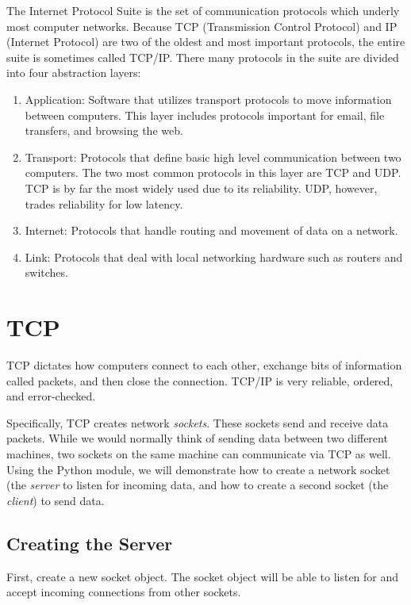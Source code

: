 
The Internet Protocol Suite is the set of communication protocols which underly most computer networks.
Because TCP (Transmission Control Protocol) and IP (Internet Protocol) are two of the oldest and most important protocols, the entire suite is sometimes called TCP/IP.
There many protocols in the suite are divided into four abstraction layers:
\begin{enumerate}
\item Application: Software that utilizes transport protocols to move information between computers.
This layer includes protocols important for email, file transfers, and browsing the web.
\item Transport: Protocols that define basic high level communication between two computers.
The two most common protocols in this layer are TCP and UDP. 
TCP is by far the most widely used due to its reliability.
UDP, however, trades reliability for low latency.
\item Internet: Protocols that handle routing and movement of data on a network.
\item Link: Protocols that deal with local networking hardware such as routers and switches.
\end{enumerate}

\section*{TCP}
TCP dictates how computers connect to each other, exchange bits of information called packets, and then close the connection.
TCP/IP is very reliable, ordered, and error-checked.

Specifically, TCP creates network \textit{sockets}. These sockets send and receive data packets. While we would normally think of sending data between two different machines, two sockets on the same machine can communicate via TCP as well. Using the Python  module, we will demonstrate how to create a network socket (the \textit{server} to listen for incoming data, and how to create a second socket (the \textit{client}) to send data.



\subsection*{Creating the Server}
First, create a new socket object. 
The socket object will be able to listen for and accept incoming connections from other sockets.


